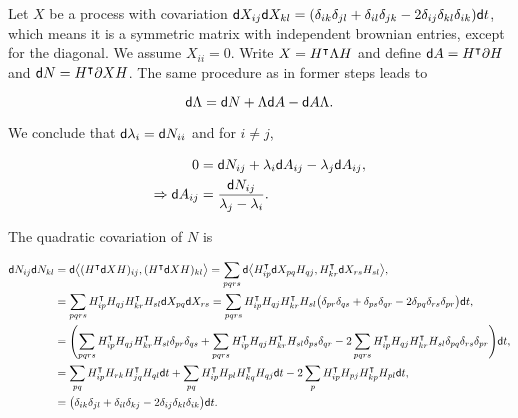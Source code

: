 
Let $X$ be a process with covariation $\mathsf d X_{ij}\mathsf d X_{kl} = (\delta_{ik}\delta_{jl} + \delta_{il}\delta_{jk} - 2\delta_{ij}\delta_{kl}\delta_{ik} )\mathsf d t$, which means it is a symmetric matrix with independent brownian entries, except for the diagonal. We assume $X_{ii} = 0$. Write $X = H^{\intercal} \Lambda H$ and define $\mathsf d A = H^{\intercal}\partial H$ and $\mathsf d N = H^{\intercal} \partial X H$. The same procedure as in former steps leads to 

\begin{equation*}
    \mathsf d \Lambda = \mathsf d N + \Lambda \mathsf d A - \mathsf d A \Lambda.
\end{equation*}

We conclude that $\mathsf d \lambda_i = \mathsf d N_{ii}$ and for $i\neq j$, 

\begin{align*}
    0 &= \mathsf d N_{ij} + \lambda_i \mathsf d A_{ij} - \lambda_j \mathsf d A_{ij},\\
    \Rightarrow \mathsf d A_{ij} &= \frac{\mathsf d N_{ij}}{\lambda_j - \lambda_i}.
\end{align*}

The quadratic covariation of $N$ is

\begin{align*}
    \mathsf d N_{ij}\mathsf d N_{kl} &= \mathsf d \bigl< (H^{\intercal} \mathsf d X H)_{ij}, (H^{\intercal}\mathsf d X H)_{kl} \bigr> = \sum_{pqrs} \mathsf d \bigl< H^{\intercal}_{ip} \mathsf d X_{pq} H_{qj}, H^{\intercal}_{kr}\mathsf d X_{rs} H_{sl} \bigr>,\\
    &= \sum_{pqrs} H^{\intercal}_{ip}  H_{qj}H^{\intercal}_{kr} H_{sl} \mathsf d X_{pq}\mathsf d X_{rs} = \sum_{pqrs} H^{\intercal}_{ip}  H_{qj}H^{\intercal}_{kr} H_{sl}\bigl( \delta_{pr}\delta_{qs} + \delta_{ps}\delta_{qr} - 2 \delta_{pq}\delta_{rs}\delta_{pr} \bigr)\mathsf d t,\\
    &= \Biggl(\sum_{pqrs}H^{\intercal}_{ip}  H_{qj}H^{\intercal}_{kr} H_{sl}\delta_{pr}\delta_{qs} + \sum_{pqrs}H^{\intercal}_{ip}  H_{qj}H^{\intercal}_{kr} H_{sl}\delta_{ps}\delta_{qr} - 2 \sum_{pqrs}H^{\intercal}_{ip}  H_{qj}H^{\intercal}_{kr} H_{sl}\delta_{pq}\delta_{rs}\delta_{pr}\Biggr) \mathsf d t,\\
    &= \sum_{pq} H^{\intercal}_{ip}H_{rk}H^{\intercal}_{jq}H_{ql}\mathsf d t + \sum_{pq}H^{\intercal}_{ip}H_{pl}H^{\intercal}_{kq}H_{qj} \mathsf d t - 2 \sum_{p} H^{\intercal}_{ip}H_{pj}H^{\intercal}_{kp}H_{pl} \mathsf d t,\\
    &= \bigl(\delta_{ik}\delta_{jl} + \delta_{il}\delta_{kj} - 2\delta_{ij}\delta_{kl}\delta_{ik} \bigr)\mathsf d t.
\end{align*}

